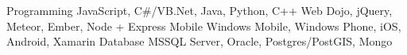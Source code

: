 \begin{cvskills}
  \cvskill
    {Programming}
    {JavaScript, C\#/VB.Net, Java, Python, C++}
  \cvskill
    {Web}
    {Dojo, jQuery, Meteor, Ember, Node + Express}
  \cvskill
    {Mobile}
    {Windows Mobile, Windows Phone, iOS, Android, Xamarin}
  \cvskill
    {Database}
    {MSSQL Server, Oracle, Postgres/PostGIS, Mongo}
\end{cvskills}

